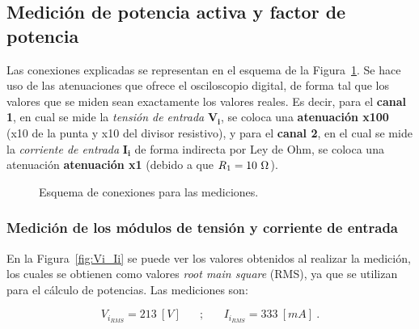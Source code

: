   \subsection{Medición de potencia activa y factor de potencia} 
    Las conexiones explicadas se representan en el esquema de la Figura~\ref{fig:EsquemaConexiones}.
    Se hace uso de las atenuaciones que ofrece el osciloscopio digital, de forma tal que los valores
    que se miden sean exactamente los valores reales. Es decir, para el \textbf{canal 1}, en cual se mide
    la \textit{tensión de entrada} $\mathbf{V_i}$, se coloca una \textbf{atenuación x100} (x10 de la punta
    y x10 del divisor resistivo), y para el \textbf{canal 2}, en el cual se mide la \textit{corriente de entrada}
    $\mathbf{I_i}$ de forma indirecta por Ley de Ohm, se coloca una atenuación \textbf{atenuación x1}
    (debido a que $R\textsubscript{1}=10\ \Omega$).

    \begin{figure}[H]
      \centering
      \caption{Esquema de conexiones para las mediciones.}
      \label{fig:EsquemaConexiones}
    \end{figure}

    \subsubsection{Medición de los módulos de tensión y corriente de entrada}
      En la Figura~\ref{fig:Vi_Ii} se puede ver los valores obtenidos al realizar la medición, los cuales
      se obtienen como valores \textit{root main square} (RMS), ya que se utilizan para el cálculo de 
      potencias. Las mediciones son:
      
      \begin{equation*}
        \boxed{V_{i_{RMS}} =  213 \ [V]} \hspace{20pt} ; \hspace{20pt} \boxed{I_{i_{RMS}} = 333\ [mA]}\ .
      \end{equation*}
      
